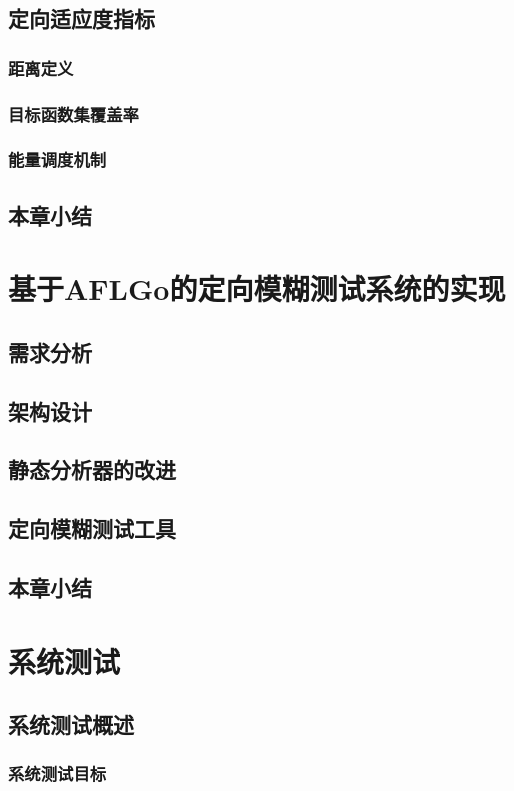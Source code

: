\documentclass[bachelor]{njupthesis}
\begin{document}
\section{定向适应度指标}
\subsection{距离定义}
\subsection{目标函数集覆盖率}
\subsection{能量调度机制}
\section{本章小结}


\chapter{基于AFLGo的定向模糊测试系统的实现}
\section{需求分析}
\section{架构设计}
\section{静态分析器的改进}
\section{定向模糊测试工具}
\section{本章小结}

\chapter{系统测试}
\section{系统测试概述}
\subsection{系统测试目标}
\end{document}
